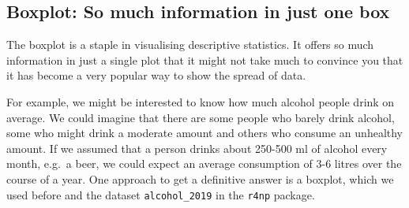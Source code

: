 \documentclass[
  letterpaper,
  DIV=11,
  numbers=noendperiod]{scrreprt}
\begin{document}
\subsection{Boxplot: So much information in just one
box}\label{sec-boxplot}

The boxplot is a staple in visualising descriptive statistics. It offers
so much information in just a single plot that it might not take much to
convince you that it has become a very popular way to show the spread of
data.

For example, we might be interested to know how much alcohol people
drink on average. We could imagine that there are some people who barely
drink alcohol, some who might drink a moderate amount and others who
consume an unhealthy amount. If we assumed that a person drinks about
250-500 ml of alcohol every month, e.g.~a beer, we could expect an
average consumption of 3-6 litres over the course of a year. One
approach to get a definitive answer is a boxplot, which we used before
and the dataset \texttt{alcohol\_2019} in the \texttt{r4np} package.
\end{document}
